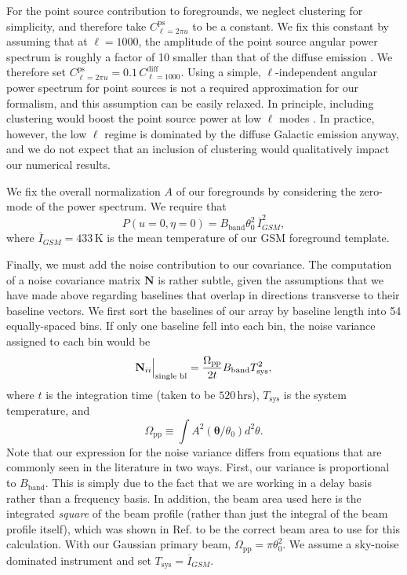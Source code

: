 \documentclass[twocolumn,aps,prd,nofootinbib,showpacs]{revtex4-1}
\begin{document}
For the point source contribution to foregrounds, we neglect clustering for simplicity, and therefore take $C_{\ell = 2 \pi u}^\textrm{ps}$ to be a constant.  We fix this constant by assuming that at $\ell = 1000$, the amplitude of the point source angular power spectrum is roughly a factor of 10 smaller than that of the diffuse emission \cite{Santos2005}.  We therefore set $C_{\ell = 2 \pi u}^\textrm{ps} = 0.1 \,C_{\ell=1000}^\textrm{diff}$.  Using a simple, $\ell$-independent angular power spectrum for point sources is not a required approximation for our formalism, and this assumption can be easily relaxed.  In principle, including clustering would boost the point source power at low $\ell$ modes \cite{DiMatteo2002}.  In practice, however, the low $\ell$ regime is dominated by the diffuse Galactic emission anyway, and we do not expect that an inclusion of clustering would qualitatively impact our numerical results.

We fix the overall normalization $A$ of our foregrounds by considering the zero-mode of the power spectrum.  We require that
\begin{equation}
P(u=0,\eta=0) = B_\textrm{band} \theta_0^2 \,\overline{I}_{GSM}^2,
\end{equation}
where $\overline{I}_{GSM} = 433\,\textrm{K}$ is the mean temperature of our GSM foreground template.

Finally, we must add the noise contribution to our covariance.  The computation of a noise covariance matrix $\mathbf{N}$ is rather subtle, given the assumptions that we have made above regarding baselines that overlap in directions transverse to their baseline vectors.  We first sort the baselines of our array by baseline length into 54 equally-spaced bins.  If only one baseline fell into each bin, the noise variance assigned to each bin would be \cite{Parsons2012a}
\begin{equation}
\mathbf{N}_{ii} \Big{|}_\textrm{single bl} = \frac{\Omega_{\textrm{pp}}}{2t}  B_\textrm{band} T_\textrm{sys}^2,
\end{equation}
where $t$ is the integration time (taken to be $520\,\textrm{hrs}$), $T_\textrm{sys}$ is the system temperature, and
\begin{equation}
\Omega_\textrm{pp} \equiv  \int A^2(\boldsymbol\theta  / \theta_0) d^2 \theta.
\end{equation}
Note that our expression for the noise variance differs from equations that are commonly seen in the literature in two ways.  First, our variance is proportional to $B_\textrm{band}$.  This is simply due to the fact that we are working in a delay basis rather than a frequency basis.  In addition, the beam area used here is the integrated \emph{square} of the beam profile (rather than just the integral of the beam profile itself), which was shown in Ref. \cite{Parsons2013} to be the correct beam area to use for this calculation.  With our Gaussian primary beam, $\Omega_\textrm{pp} = \pi \theta_0^2$.  We assume a sky-noise dominated instrument and set $T_\textrm{sys} = \overline{I}_{GSM}$.
\end{document}
